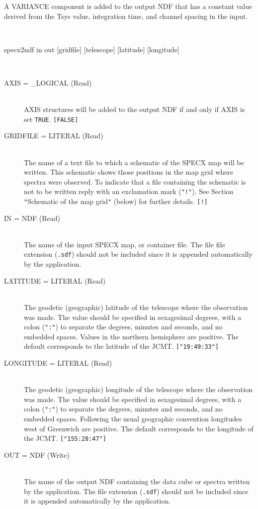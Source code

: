 \documentclass[twoside,11pt]{article}
\newcommand{\htmlref}[2]{#1}
\newcommand{\xref}[3]{#1}
\newcommand{\sstusage}[1]{\item[Usage:] \mbox{}
\\[1.3ex]{\raggedright \ssttt #1}}
\newcommand{\sstparameters}[1]{
   \goodbreak 
   \item[Parameters:] \mbox{} \\
   \vspace{-3.5ex}
   \begin{description}
      #1
   \end{description}
}
\newcommand{\sstsubsection}[1]{ \item[{#1}] \mbox{} \\}
\newcommand{\sstusage}[1]{\item[\htmlref{Usage:}{app_usage}]
      \begin{description}
         {\ssttt #1}
      \end{description}
      \\
   }
\newcommand{\sstparameters}[1]{
      \item[\xref{Parameters:}{sun95}{se_param}] \\
      \begin{description}
         #1
      \end{description}
   }
\newcommand{\sstsubsection}[1]{\item[{#1}]}
\begin{document}
{{      A VARIANCE component is added to the output NDF that has a 
      constant value derived from the Tsys value, integration time, and 
      channel spacing in the input.
   }
   \sstusage{
      specx2ndf in out [gridfile] [telescope] [latitude] [longitude]
   }
   \sstparameters{
      \sstsubsection{
         AXIS =  \_LOGICAL (Read)
      }{
         AXIS structures will be added to the output NDF if and only if
         AXIS is set \texttt{TRUE}.  \texttt{[FALSE]}
      }
      \sstsubsection{
         GRIDFILE  =  LITERAL (Read)
      }{
         The name of a text file to which a schematic of the SPECX map
         will be written.  This schematic shows those positions in the
         map grid where spectra were observed.  To indicate that a file
         containing the schematic is not to be written reply with an
         exclamation mark (\texttt{"!"}).  See Section 
         \htmlref{\texttt{"}Schematic of the map grid\texttt{"}}{SCHEMATICMAP}
         (below) for further details.  \texttt{[!]}
      }
      \sstsubsection{
         IN  =  NDF (Read)
      }{
         The name of the input SPECX map, or container file.  The file
         file extension (\texttt{.sdf}) should not be included since it
         is appended automatically by the application.
      }
      \sstsubsection{
         LATITUDE  =  LITERAL (Read)
      }{
         The geodetic (geographic) latitude of the telescope where the
         observation was made.  The value should be specified in
         sexagesimal degrees, with a colon (\texttt{":"}) to separate the
         degrees, minutes and seconds, and no embedded spaces.  Values in
         the northern hemisphere are positive.  The default corresponds
         to the latitude of the JCMT.  \texttt{["19:49:33"]}
      }
      \sstsubsection{
         LONGITUDE  =  LITERAL (Read)
      }{
         The geodetic (geographic) longitude of the telescope where the
         observation was made.  The value should be specified in
         sexagesimal degrees, with a colon (\texttt{":"}) to separate the
         degrees, minutes and seconds, and no embedded spaces.  Following
         the usual geographic convention longitudes west of Greenwich are
         positive.  The default corresponds to the longitude of the
         JCMT.  \texttt{["155:28:47"]}
      }
      \sstsubsection{
         OUT  =  NDF (Write)
      }{
         The name of the output NDF containing the data cube or spectra written
         by the application.  The file extension (\texttt{.sdf}) should not be
         included since it is appended automatically by the application.
}}}
\end{document}
